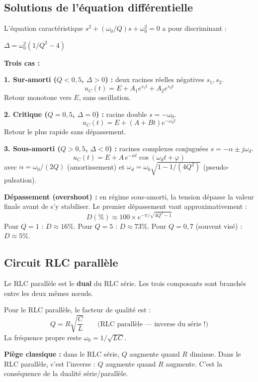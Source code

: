 \documentclass[12pt,a4paper,twoside]{book}
\begin{document}
\subsection{Solutions de l'équation différentielle}

L'équation caractéristique $s^2 + (\omega_0/Q)s + \omega_0^2 = 0$ a pour discriminant :

$\Delta = \omega_0^2(1/Q^2 - 4)$

\textbf{Trois cas :}

\textbf{1. Sur-amorti ($Q < 0{,}5$, $\Delta > 0$) :} deux racines réelles négatives $s_1, s_2$.
\[
u_C(t) = E + A_1 e^{s_1 t} + A_2 e^{s_2 t}
\]
Retour monotone vers $E$, sans oscillation.

\textbf{2. Critique ($Q = 0{,}5$, $\Delta = 0$) :} racine double $s = -\omega_0$.
\[
u_C(t) = E + (A + Bt)e^{-\omega_0 t}
\]
Retour le plus rapide sans dépassement.

\textbf{3. Sous-amorti ($Q > 0{,}5$, $\Delta < 0$) :} racines complexes conjuguées $s = -\alpha \pm j\omega_d$.
\[
u_C(t) = E + A\,e^{-\alpha t}\cos(\omega_d t + \varphi)
\]
avec $\alpha = \omega_0/(2Q)$ (amortissement) et $\omega_d = \omega_0\sqrt{1 - 1/(4Q^2)}$ (pseudo-pulsation).

\begin{pratique}
\textbf{Dépassement (overshoot) :} en régime sous-amorti, la tension dépasse la valeur finale avant de s'y stabiliser. Le premier dépassement vaut approximativement :
\[
D(\%) \approx 100 \times e^{-\pi/\sqrt{4Q^2 - 1}}
\]
Pour $Q = 1$ : $D \approx 16\%$. Pour $Q = 5$ : $D \approx 73\%$. Pour $Q = 0{,}7$ (souvent visé) : $D \approx 5\%$.
\end{pratique}

\subsection{Circuit RLC parallèle}

Le RLC parallèle est le \textbf{dual} du RLC série. Les trois composants sont branchés entre les deux mêmes n\oe uds.

\begin{formule}
Pour le RLC parallèle, le facteur de qualité est :
\[
\boxed{Q = R\sqrt{\frac{C}{L}}} \qquad \text{(RLC parallèle --- inverse du série !)}
\]
La fréquence propre reste $\omega_0 = 1/\sqrt{LC}$.
\end{formule}

\begin{attention}
\textbf{Piège classique :} dans le RLC série, $Q$ augmente quand $R$ diminue. Dans le RLC parallèle, c'est l'inverse : $Q$ augmente quand $R$ augmente. C'est la conséquence de la dualité série/parallèle.
\end{attention}
\end{document}
